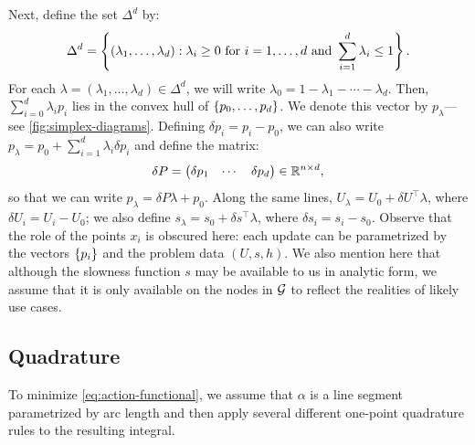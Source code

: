 \documentclass[sisc-eikonal.tex]{subfiles}
\begin{document}
Next, define the set $\Delta^d$ by:
\begin{equation}
  \Delta^d = \left\{(\lambda_1, \hdots, \lambda_d) : \lambda_i \geq 0 \mbox{ for } i = 1, \hdots, d \mbox{ and } \sum_{i=1}^d \lambda_i \leq 1\right\}.
\end{equation}
For each $\lambda = (\lambda_1, \hdots, \lambda_d) \in \Delta^d$, we
will write $\lambda_0 = 1 - \lambda_1 - \cdots - \lambda_d$. Then,
$\sum_{i=0}^d \lambda_i p_i$ lies in the convex hull of
$\left\{p_0, \hdots, p_d\right\}$. We denote this vector by $p_\lambda$---see
\cref{fig:simplex-diagrams}. Defining $\delta p_i = p_i - p_0$, we can
also write $p_\lambda = p_0 + \sum_{i=1}^d \lambda_i \delta p_i$ and
define the matrix:
\begin{equation}
  \delta P = \begin{pmatrix} \delta p_1 & \cdots & \delta p_d \end{pmatrix} \in \mathbb{R}^{n \times d},
\end{equation}
so that we can write $p_\lambda = \delta P \lambda + p_0$. Along the
same lines, $U_\lambda = U_0 + \delta U^\top \lambda$, where
$\delta U_i = U_i - U_0$; we also define
$s_\lambda = s_0 + \delta s^\top \lambda$, where
$\delta s_i = s_i - s_0$. Observe that the role of the points $x_i$ is
obscured here: each update can be parametrized by the vectors
$\left\{p_i\right\}$ and the problem data $(U, s, h)$. We also mention here
that although the slowness function $s$ may be available to us in
analytic form, we assume that it is only available on the nodes in
$\mathcal{G}$ to reflect the realities of likely use cases.

\subsection{Quadrature}\label{ssec:quadrature}

To minimize \cref{eq:action-functional}, we assume that $\alpha$ is a
line segment parametrized by arc length and then apply several
different one-point quadrature rules to the resulting integral.
\end{document}
